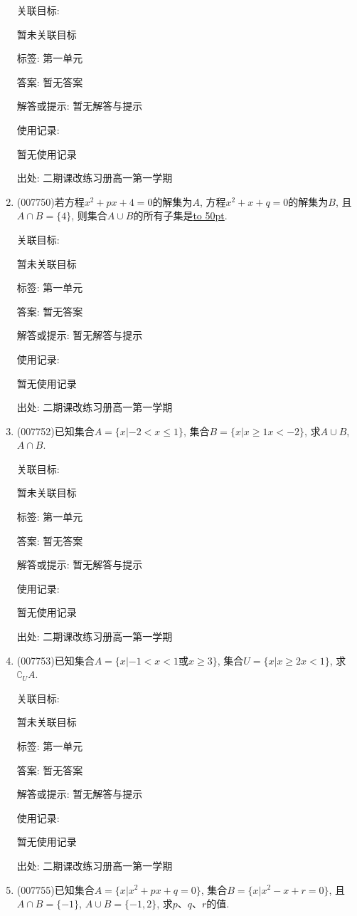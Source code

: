 \documentclass[10pt,a4paper]{article}
\newcommand{\blank}[1]{\underline{\hbox to #1pt{}}}
\begin{document}
\begin{enumerate}[1.]
关联目标:

暂未关联目标



标签: 第一单元

答案: 暂无答案

解答或提示: 暂无解答与提示

使用记录:

暂无使用记录


出处: 二期课改练习册高一第一学期
\item { (007750)}若方程$x^2+px+4=0$的解集为$A$, 方程$x^2+x+q=0$的解集为$B$, 且$A\cap B=\{4\}$, 则集合$A\cup B$的所有子集是\blank{50}.


关联目标:

暂未关联目标



标签: 第一单元

答案: 暂无答案

解答或提示: 暂无解答与提示

使用记录:

暂无使用记录


出处: 二期课改练习册高一第一学期
\item { (007752)}已知集合$A=\{x|-2<x\le 1\}$, 集合$B=\{x|x\ge 1x<-2\}$, 求$A\cup B$, $A\cap B$.


关联目标:

暂未关联目标



标签: 第一单元

答案: 暂无答案

解答或提示: 暂无解答与提示

使用记录:

暂无使用记录


出处: 二期课改练习册高一第一学期
\item { (007753)}已知集合$A=\{x|-1<x<1$或$x\ge 3\}$, 集合$U=\{x|x\ge 2x<1\}$, 求$\complement _UA$.


关联目标:

暂未关联目标



标签: 第一单元

答案: 暂无答案

解答或提示: 暂无解答与提示

使用记录:

暂无使用记录


出处: 二期课改练习册高一第一学期
\item { (007755)}已知集合$A=\{x|x^2+px+q=0\}$, 集合$B=\{x|x^2-x+r=0\}$, 且$A\cap B=\{-1\}$, $A\cup B=\{-1,2\}$, 求$p$、$q$、$r$的值.



\end{enumerate}
\end{document}
